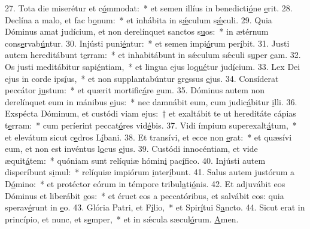 27. Tota die miserétur et c\uline{ó}mmodat:~* et semen illíus in benedicti\uline{ó}ne \uline{e}rit.
28. Declína a malo, et fac b\uline{o}num:~* et inhábita in s\uline{ǽ}culum s\uline{ǽ}culi.
29. Quia Dóminus amat judícium, et non derelínquet sanctos s\uline{u}os:~* in ætérnum cons\uline{e}rvab\uline{ú}ntur.
30. Injústi puni\uline{é}ntur:~* et semen impi\uline{ó}rum per\uline{í}bit.
31. Justi autem hereditábunt t\uline{e}rram:~* et inhabitábunt in sǽculum sǽculi s\uline{u}per \uline{e}am.
32. Os justi meditábitur sapi\uline{é}ntiam,~* et lingua ejus lo\uline{qué}tur jud\uline{í}cium.
33. Lex Dei ejus in corde ips\uline{í}us,~* et non supplantabúntur gr\uline{e}ssus \uline{e}jus.
34. Consíderat peccátor j\uline{u}stum:~* et quærit mortific\uline{á}re \uline{e}um.
35. Dóminus autem non derelínquet eum in mánibus \uline{e}jus:~* nec damnábit eum, cum judic\uline{á}bitur \uline{i}lli.
36. Exspécta Dóminum, et custódi viam ejus:~† et exaltábit te ut hereditáte cápias t\uline{e}rram:~* cum períerint peccat\uline{ó}res vid\uline{é}bis.
37. Vidi ímpium superexalt\uline{á}tum,~* et elevátum sicut c\uline{e}dros L\uline{í}bani.
38. Et transívi, et ecce non \uline{e}rat:~* et quæsívi eum, et non est invéntus l\uline{o}cus \uline{e}jus.
39. Custódi innocéntiam, et vide æquit\uline{á}tem:~* quóniam sunt relíquiæ hómin\uline{i} pac\uline{í}fico.
40. Injústi autem disperíbunt s\uline{i}mul:~* relíquiæ impiórum \uline{i}nter\uline{í}bunt.
41. Salus autem justórum a D\uline{ó}mino:~* et protéctor eórum in témpore tribul\uline{a}ti\uline{ó}nis.
42. Et adjuvábit eos Dóminus et liberábit \uline{e}os:~* et éruet eos a peccatóribus, et salvábit eos: quia sperav\uline{é}runt in \uline{e}o.
43. Glória Patri, et F\uline{í}lio,~* et Spir\uline{í}tui S\uline{a}ncto.
44. Sicut erat in princípio, et nunc, et s\uline{e}mper,~* et in sǽcula sæcul\uline{ó}rum. \uline{A}men.
